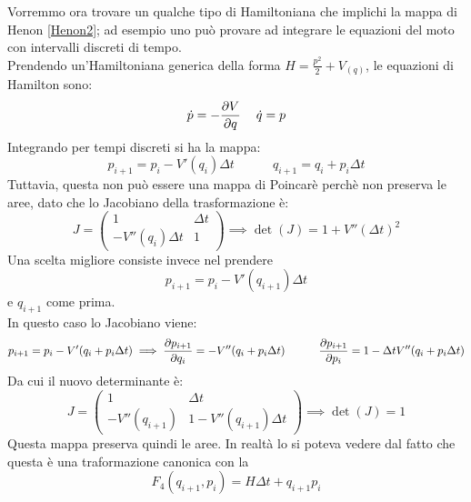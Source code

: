 \documentclass[a4paper,12pt]{article}
\renewcommand{\arg}[1]{_{(#1)}}
\theoremstyle{plain}
\theoremstyle{definition}
\newcommand{\f}[2]{\frac{#1}{#2}}
\theoremstyle{remark}
\begin{document}
Vorremmo ora trovare un qualche tipo di Hamiltoniana che implichi la mappa di Henon \ref{Henon2}; ad esempio uno può provare ad integrare le equazioni del moto con intervalli discreti di tempo. \\Prendendo un'Hamiltoniana generica della forma $H=\f{p^2}{2}+V\arg{q}$, le equazioni di Hamilton sono:
\[\dot{p}=-\pdv{V}{q}\:\:\:\;\;\dot{q}=p\]
Integrando per tempi discreti si ha la mappa:
\[p_{i+1}=p_i-V'(q_i)\Delta t\quad\quad\quad	q_{i+1}=q_i+p_i\Delta t\]
Tuttavia, questa non può essere una mappa di Poincarè perchè non preserva le aree, dato che lo Jacobiano della trasformazione è:
\[J=\begin{pmatrix}
1&\Delta t\\ 
 -V''(q_i)\Delta t& 1
\end{pmatrix}\implies\det(J)=1+	V'' (\Delta t)^2	\]
Una scelta migliore consiste invece nel prendere \[p_{i+1}=p_i-V'(q_{i+1})\Delta t\]
e $q_{i+1}$ come prima.\\
In questo caso lo Jacobiano viene:
\[p_{i+1}=p_i-V'(q_i+p_i\Delta t)\implies\pdv{p_{i+1}}{q_i}=-V''(q_i+p_i\Delta t)\quad\quad\quad\pdv{p_{i+1}}{p_i}=1-\Delta t V''(q_i+p_i\Delta t)\]
Da cui il nuovo determinante è:
\[J=\begin{pmatrix}
1&\Delta t\\ 
-V''(q_{i+1})& 1- V''(q_{i+1})\Delta t
\end{pmatrix}\implies\det(J)=1	\]
Questa mappa preserva quindi le aree. In realtà lo si poteva vedere dal fatto che questa è una traformazione canonica con la \[F_4(q_{i+1},p_{i})=H \Delta t+q_{i+1}p_{i}\]
\end{document}
